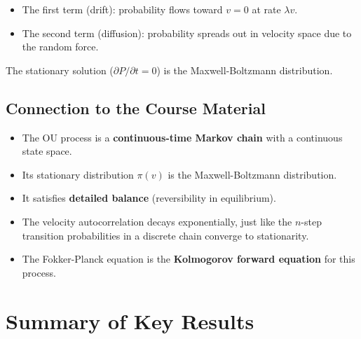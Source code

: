 \documentclass[11pt,a4paper]{article}
\begin{document}
	\begin{itemize}
		\item The first term (drift): probability flows toward $v=0$ at rate $\lambda v$.
		\item The second term (diffusion): probability spreads out in velocity space due to the random force.
	\end{itemize}
	
	The stationary solution ($\partial P / \partial t = 0$) is the Maxwell-Boltzmann distribution.
	
	\subsection{Connection to the Course Material}
	
	\begin{itemize}
		\item The OU process is a \textbf{continuous-time Markov chain} with a continuous state space.
		\item Its stationary distribution $\pi(v)$ is the Maxwell-Boltzmann distribution.
		\item It satisfies \textbf{detailed balance} (reversibility in equilibrium).
		\item The velocity autocorrelation decays exponentially, just like the $n$-step transition probabilities in a discrete chain converge to stationarity.
		\item The Fokker-Planck equation is the \textbf{Kolmogorov forward equation} for this process.
	\end{itemize}
	
	\section{Summary of Key Results}
	
\end{document}
